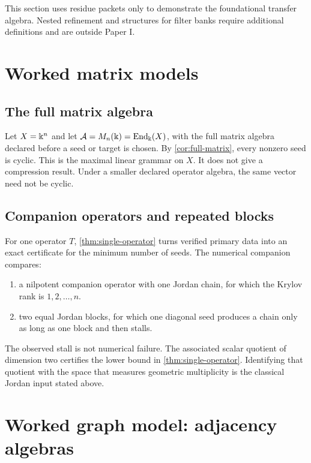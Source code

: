 \begin{boundary}
This section uses residue packets only to demonstrate the foundational transfer algebra. Nested refinement and structures for filter banks require additional definitions and are outside Paper I.
\end{boundary}

\section{Worked matrix models}

\subsection{The full matrix algebra}

Let $X=\Bbbk^n$ and let $\mathcal A=M_n(\Bbbk)=\operatorname{End}_{\Bbbk}(X)$, with the full matrix algebra declared before a seed or target is chosen. By \cref{cor:full-matrix}, every nonzero seed is cyclic. This is the maximal linear grammar on $X$. It does not give a compression result. Under a smaller declared operator algebra, the same vector need not be cyclic.

\subsection{Companion operators and repeated blocks}

For one operator $T$, \cref{thm:single-operator} turns verified primary data
into an exact certificate for the minimum number of seeds.  The numerical companion compares:
\begin{enumerate}[label=(\alph*)]
\item a nilpotent companion operator with one Jordan chain, for which the Krylov rank is $1,2,\ldots,n$.
\item two equal Jordan blocks, for which one diagonal seed produces a chain only as long as one block and then stalls.
\end{enumerate}

The observed stall is not numerical failure.  The associated
scalar quotient of dimension two certifies the lower bound in
\cref{thm:single-operator}. Identifying that quotient with the space that
measures geometric multiplicity is the classical Jordan input stated above.

\section{Worked graph model: adjacency algebras}

